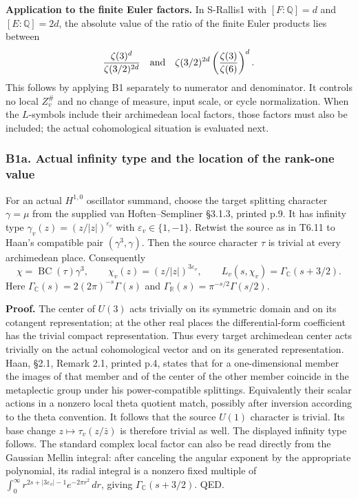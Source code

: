 \documentclass[11pt,a4paper]{article}
\theoremstyle{definition}
\begin{document}
\textbf{Application to the finite Euler factors.} In S-Rallis1 with \([F:\mathbb Q]=d\) and \([E:\mathbb Q]=2d\), the absolute value of the ratio of the finite Euler products lies between \[
 \frac{\zeta(3)^d}{\zeta(3/2)^{2d}}
 \quad\hbox{and}\quad
 \zeta(3/2)^{2d}\left(\frac{\zeta(3)}{\zeta(6)}\right)^d.
\] This follows by applying B1 separately to numerator and denominator. It controls no local \(Z_v^\#\) and no change of measure, input scale, or cycle normalization. When the \(L\)-symbols include their archimedean local factors, those factors must also be included; the actual cohomological situation is evaluated next.

\subsubsection{B1a. Actual infinity type and the location of the rank-one value}\label{b1a.-actual-infinity-type-and-the-location-of-the-rank-one-value}

For an actual \(H^{1,0}\) oscillator summand, choose the target splitting character \(\gamma=\mu\) from the supplied van Hoften--Sempliner §3.1.3, printed p.9. It has infinity type \(\gamma_v(z)=(z/|z|)^{\varepsilon_v}\) with \(\varepsilon_v\in\{1,-1\}\). Retwist the source as in T6.11 to Haan's compatible pair \((\gamma^3,\gamma)\). Then the source character \(\tau\) is trivial at every archimedean place. Consequently \[
 \chi=\operatorname{BC}(\tau)\gamma^3,
 \qquad \chi_v(z)=(z/|z|)^{3\varepsilon_v},
 \qquad L_v(s,\chi_v)=\Gamma_{\mathbb C}(s+3/2).
\tag{B1a.1}
\] Here \(\Gamma_{\mathbb C}(s)=2(2\pi)^{-s}\Gamma(s)\) and \(\Gamma_{\mathbb R}(s)=\pi^{-s/2}\Gamma(s/2)\).

\textbf{Proof.} The center of \(U(3)\) acts trivially on its symmetric domain and on its cotangent representation; at the other real places the differential-form coefficient has the trivial compact representation. Thus every target archimedean center acts trivially on the actual cohomological vector and on its generated representation. Haan, §2.1, Remark 2.1, printed p.4, states that for a one-dimensional member the images of that member and of the center of the other member coincide in the metaplectic group under his power-compatible splittings. Equivalently their scalar actions in a nonzero local theta quotient match, possibly after inversion according to the theta convention. It follows that the source \(U(1)\) character is trivial. Its base change \(z\mapsto\tau_v(z/\bar z)\) is therefore trivial as well. The displayed infinity type follows. The standard complex local factor can also be read directly from the Gaussian Mellin integral: after canceling the angular exponent by the appropriate polynomial, its radial integral is a nonzero fixed multiple of \(\int_0^\infty r^{2s+|3\varepsilon_v|-1}e^{-2\pi r^2}\,dr\), giving \(\Gamma_{\mathbb C}(s+3/2)\). QED.
\end{document}
